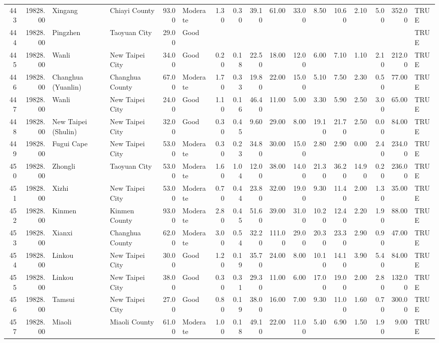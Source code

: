 \begin{table}[ht]
\begin{tabular}{rrllrlrrrrrrrrrrl}
  443 & 19828.00 & Xingang & Chiayi County & 93.00 & Moderate & 1.30 & 0.30 & 39.10 & 61.00 & 33.00 & 8.50 & 10.60 & 2.10 & 5.00 & 352.00 & TRUE \\ 
  444 & 19828.00 & Pingzhen & Taoyuan City & 29.00 & Good &  &  &  &  &  &  &  &  &  &  & TRUE \\ 
  445 & 19828.00 & Wanli & New Taipei City & 34.00 & Good & 0.20 & 0.18 & 22.50 & 18.00 & 12.00 & 6.00 & 7.10 & 1.10 & 2.10 & 212.00 & TRUE \\ 
  446 & 19828.00 & Changhua (Yuanlin) & Changhua County & 67.00 & Moderate & 1.70 & 0.33 & 19.80 & 22.00 & 15.00 & 5.10 & 7.50 & 2.30 & 0.50 & 77.00 & TRUE \\ 
  447 & 19828.00 & Wanli & New Taipei City & 24.00 & Good & 1.10 & 0.16 & 46.40 & 11.00 & 5.00 & 3.30 & 5.90 & 2.50 & 3.00 & 65.00 & TRUE \\ 
  448 & 19828.00 & New Taipei (Shulin) & New Taipei City & 32.00 & Good & 0.30 & 0.45 & 9.60 & 29.00 & 8.00 & 19.10 & 21.70 & 2.50 & 0.00 & 84.00 & TRUE \\ 
  449 & 19828.00 & Fugui Cape & New Taipei City & 53.00 & Moderate & 0.30 & 0.23 & 34.80 & 30.00 & 15.00 & 2.80 & 2.90 & 0.00 & 2.40 & 234.00 & TRUE \\ 
  450 & 19828.00 & Zhongli & Taoyuan City & 53.00 & Moderate & 1.60 & 1.04 & 12.00 & 38.00 & 14.00 & 21.30 & 36.20 & 14.90 & 0.20 & 236.00 & TRUE \\ 
  451 & 19828.00 & Xizhi & New Taipei City & 53.00 & Moderate & 0.70 & 0.44 & 23.80 & 32.00 & 19.00 & 9.30 & 11.40 & 2.00 & 1.30 & 35.00 & TRUE \\ 
  452 & 19828.00 & Kinmen & Kinmen County & 93.00 & Moderate & 2.80 & 0.45 & 51.60 & 39.00 & 31.00 & 10.20 & 12.40 & 2.20 & 1.90 & 88.00 & TRUE \\ 
  453 & 19828.00 & Xianxi & Changhua County & 62.00 & Moderate & 3.00 & 0.54 & 32.20 & 111.00 & 29.00 & 20.30 & 23.30 & 2.90 & 0.90 & 47.00 & TRUE \\ 
  454 & 19828.00 & Linkou & New Taipei City & 30.00 & Good & 1.20 & 0.19 & 35.70 & 24.00 & 8.00 & 10.10 & 14.10 & 3.90 & 5.40 & 84.00 & TRUE \\ 
  455 & 19828.00 & Linkou & New Taipei City & 38.00 & Good & 0.30 & 0.31 & 29.30 & 11.00 & 6.00 & 17.00 & 19.00 & 2.00 & 2.80 & 132.00 & TRUE \\ 
  456 & 19828.00 & Tamsui & New Taipei City & 27.00 & Good & 0.80 & 0.19 & 38.00 & 16.00 & 7.00 & 9.30 & 11.00 & 1.60 & 0.70 & 300.00 & TRUE \\ 
  457 & 19828.00 & Miaoli & Miaoli County & 61.00 & Moderate & 1.00 & 0.18 & 49.10 & 22.00 & 11.00 & 5.40 & 6.90 & 1.50 & 1.90 & 9.00 & TRUE \\ 

\end{tabular}
\end{table}
